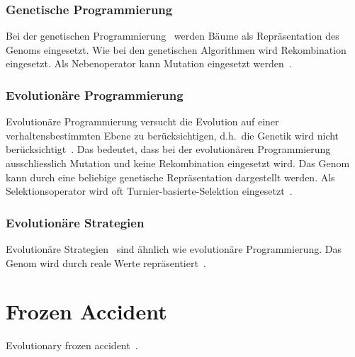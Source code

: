       \subsubsection{Genetische Programmierung\label{item:genProg}}

        Bei der genetischen Programmierung~\cite{book:genProg} werden Bäume als Repräsentation des Genoms eingesetzt.
        Wie bei den genetischen Algorithmen wird Rekombination eingesetzt.
        Als Nebenoperator kann Mutation eingesetzt werden~\cite[S.147]{book:evAlgo}.

      \subsubsection{Evolutionäre Programmierung\label{item:evProg}}

        Evolutionäre Programmierung versucht die Evolution auf einer verhaltensbestimmten Ebene zu berücksichtigen,
        d.h.\ die Genetik wird nicht berücksichtigt~\cite[S.140]{book:evAlgo}.
        Das bedeutet, dass bei der evolutionären Programmierung~\cite{book:artIntSimEv}
        ausschliesslich Mutation und keine Rekombination eingesetzt wird.
        Das Genom kann durch eine beliebige genetische Repräsentation dargestellt werden.
        Als Selektionsoperator wird oft Turnier-basierte-Selektion eingesetzt~\cite[S.33]{book:bioInspired}.

      \subsubsection{Evolutionäre Strategien\label{item:evStrat}}

        Evolutionäre Strategien~\cite{book:evStrat} sind ähnlich wie evolutionäre Programmierung.
        Das Genom wird durch reale Werte repräsentiert~\cite[S.134]{book:evAlgo}.

  \section{Frozen Accident}


    Evolutionary frozen accident~\cite{Crick1968}.
